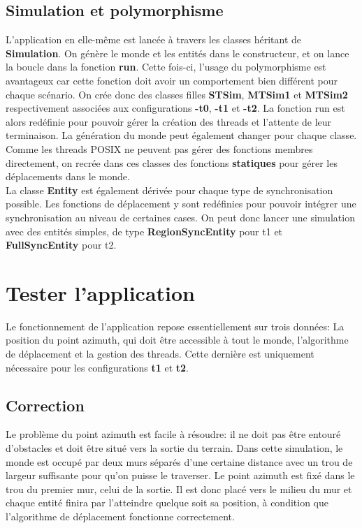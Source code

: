 \documentclass[11pt]{article} %
\begin{document}
\subsection{Simulation et polymorphisme}
L'application en elle-même est lancée à travers les classes héritant de \textbf{Simulation}. On génère le monde et les entités dans le constructeur, et on lance la boucle dans la fonction \textbf{run}. Cette fois-ci, l'usage du polymorphisme est avantageux car cette fonction doit avoir un comportement bien différent pour chaque scénario. On crée donc des classes filles \textbf{STSim},  \textbf{MTSim1} et \textbf{MTSim2} respectivement associées aux configurations \textbf{-t0}, \textbf{-t1} et \textbf{-t2}. La fonction run est alors redéfinie pour pouvoir gérer la création des threads et l'attente de leur terminaison. La génération du monde peut également changer pour chaque classe.
Comme les threads POSIX ne peuvent pas gérer des fonctions membres directement, on recrée dans ces classes des fonctions \textbf{statiques} pour gérer les déplacements dans le monde.  \\

La classe \textbf{Entity} est également dérivée pour chaque type de synchronisation possible. Les fonctions de déplacement y sont redéfinies pour pouvoir intégrer une synchronisation au niveau de certaines cases. On peut donc lancer une simulation avec des entités simples, de type \textbf{RegionSyncEntity} pour t1 et \textbf{FullSyncEntity} pour t2.

\section{Tester l'application}
Le fonctionnement de l'application repose essentiellement sur trois données: La position du point azimuth, qui doit être accessible à tout le monde, l'algorithme de déplacement et la gestion des threads. Cette dernière est uniquement nécessaire pour les configurations \textbf{t1} et \textbf{t2}.

\subsection{Correction}

Le problème du point azimuth est facile à résoudre: il ne doit pas être entouré d'obstacles et doit être situé vers la sortie du terrain. Dans cette simulation, le monde est occupé par deux murs séparés d'une certaine distance avec un trou de largeur suffisante pour qu'on puisse le traverser. Le point azimuth est fixé dans le trou du premier mur, celui de la sortie. Il est donc placé vers le milieu du mur et chaque entité finira par l'atteindre quelque soit sa position, à condition que l'algorithme de déplacement fonctionne correctement.
\end{document}
